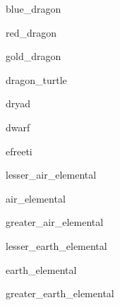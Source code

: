 \documentclass[a4paper,serif]{module}
\begin{document}
\begin{newmonster}{blue_dragon}\end{newmonster}

\begin{newmonster}{red_dragon}\end{newmonster}

\begin{newmonster}{gold_dragon}\end{newmonster}

\begin{newmonster}{dragon_turtle}\end{newmonster}

\begin{newmonster}{dryad}\end{newmonster}

\begin{newmonster}{dwarf}\end{newmonster}

\begin{newmonster}{efreeti}\end{newmonster}


\begin{newmonster}{lesser_air_elemental}\end{newmonster}

\begin{newmonster}{air_elemental}\end{newmonster}

\begin{newmonster}{greater_air_elemental}\end{newmonster}

\begin{newmonster}{lesser_earth_elemental}\end{newmonster}

\begin{newmonster}{earth_elemental}\end{newmonster}

\begin{newmonster}{greater_earth_elemental}\end{newmonster}
\end{document}
